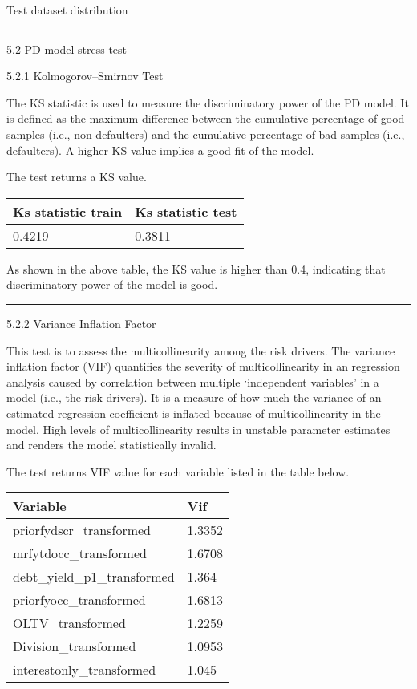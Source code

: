 Test dataset distribution

\begin{center}\rule{0.5\linewidth}{\linethickness}\end{center}

5.2 PD model stress test

5.2.1 Kolmogorov--Smirnov Test

The KS statistic is used to measure the discriminatory power of the PD
model. It is defined as the maximum difference between the cumulative
percentage of good samples (i.e., non-defaulters) and the cumulative
percentage of bad samples (i.e., defaulters). A higher KS value implies
a good fit of the model.

The test returns a KS value.

\begin{longtable}[]{@{}ll@{}}
\toprule
Ks statistic train & Ks statistic test\tabularnewline
\midrule
\endhead
0.4219 & 0.3811\tabularnewline
\bottomrule
\end{longtable}

As shown in the above table, the KS value is higher than 0.4, indicating
that discriminatory power of the model is good.

\begin{center}\rule{0.5\linewidth}{\linethickness}\end{center}

5.2.2 Variance Inflation Factor

This test is to assess the multicollinearity among the risk drivers. The
variance inflation factor (VIF) quantifies the severity of
multicollinearity in an regression analysis caused by correlation
between multiple `independent variables' in a model (i.e., the risk
drivers). It is a measure of how much the variance of an estimated
regression coefficient is inflated because of multicollinearity in the
model. High levels of multicollinearity results in unstable parameter
estimates and renders the model statistically invalid.

The test returns VIF value for each variable listed in the table below.

\begin{longtable}[]{@{}ll@{}}
\toprule
Variable & Vif\tabularnewline
\midrule
\endhead
priorfydscr\_transformed & 1.3352\tabularnewline
mrfytdocc\_transformed & 1.6708\tabularnewline
debt\_yield\_p1\_transformed & 1.364\tabularnewline
priorfyocc\_transformed & 1.6813\tabularnewline
OLTV\_transformed & 1.2259\tabularnewline
Division\_transformed & 1.0953\tabularnewline
interestonly\_transformed & 1.045\tabularnewline
\bottomrule
\end{longtable}

